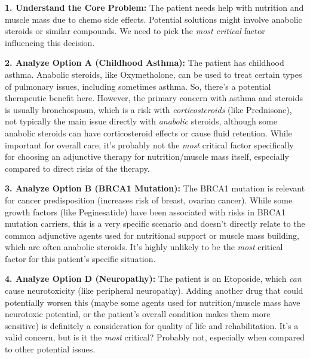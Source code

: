 \documentclass{article}
\theoremstyle{plain}
\theoremstyle{definition}
\theoremstyle{remark}
\begin{document}
\begin{tcolorbox}
{\begin{minipage}{\dimexpr\linewidth-4mm}
        \vspace{0.3cm}
        \textbf{1. Understand the Core Problem:} The patient needs help with nutrition and muscle mass due to chemo side effects. Potential solutions might involve anabolic steroids or similar compounds. We need to pick the \textit{most critical} factor influencing this decision.

        \vspace{0.2cm}
        \textbf{2. Analyze Option A (Childhood Asthma):} The patient has childhood asthma. Anabolic steroids, like Oxymetholone, can be used to treat certain types of pulmonary issues, including sometimes asthma. So, there's a potential therapeutic benefit here. However, the primary concern with asthma and steroids is usually bronchospasm, which is a risk with \textit{corticosteroids} (like Prednisone), not typically the main issue directly with \textit{anabolic} steroids, although some anabolic steroids can have corticosteroid effects or cause fluid retention. While important for overall care, it's probably not the \textit{most} critical factor specifically for choosing an adjunctive therapy for nutrition/muscle mass itself, especially compared to direct risks of the therapy.

        \vspace{0.2cm}
        \textbf{3. Analyze Option B (BRCA1 Mutation):} The BRCA1 mutation is relevant for cancer predisposition (increases risk of breast, ovarian cancer). While some growth factors (like Peginesatide) have been associated with risks in BRCA1 mutation carriers, this is a very specific scenario and doesn't directly relate to the common adjunctive agents used for nutritional support or muscle mass building, which are often anabolic steroids. It's highly unlikely to be the \textit{most} critical factor for this patient's specific situation.

        \vspace{0.2cm}
        \textbf{4. Analyze Option D (Neuropathy):} The patient is on Etoposide, which \textit{can} cause neurotoxicity (like peripheral neuropathy). Adding another drug that could potentially worsen this (maybe some agents used for nutrition/muscle mass have neurotoxic potential, or the patient's overall condition makes them more sensitive) is definitely a consideration for quality of life and rehabilitation. It's a valid concern, but is it the \textit{most} critical? Probably not, especially when compared to other potential issues.


\end{minipage}}
\end{tcolorbox}
\end{document}

